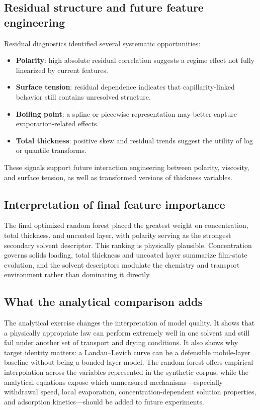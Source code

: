 \documentclass[11pt]{article}
\begin{document}
\subsection{Residual structure and future feature engineering}
Residual diagnostics identified several systematic opportunities:
\begin{itemize}
    \item \textbf{Polarity}: high absolute residual correlation suggests a regime effect not fully linearized by current features.
    \item \textbf{Surface tension}: residual dependence indicates that capillarity-linked behavior still contains unresolved structure.
    \item \textbf{Boiling point}: a spline or piecewise representation may better capture evaporation-related effects.
    \item \textbf{Total thickness}: positive skew and residual trends suggest the utility of log or quantile transforms.
\end{itemize}

These signals support future interaction engineering between polarity, viscosity, and surface tension, as well as transformed versions of thickness variables.

\subsection{Interpretation of final feature importance}
The final optimized random forest placed the greatest weight on concentration, total thickness, and uncoated layer, with polarity serving as the strongest secondary solvent descriptor. This ranking is physically plausible. Concentration governs solids loading, total thickness and uncoated layer summarize film-state evolution, and the solvent descriptors modulate the chemistry and transport environment rather than dominating it directly.

\subsection{What the analytical comparison adds}
The analytical exercise changes the interpretation of model quality. It shows that a physically appropriate law can perform extremely well in one solvent and still fail under another set of transport and drying conditions. It also shows why target identity matters: a Landau--Levich curve can be a defensible mobile-layer baseline without being a bonded-layer model. The random forest offers empirical interpolation across the variables represented in the synthetic corpus, while the analytical equations expose which unmeasured mechanisms---especially withdrawal speed, local evaporation, concentration-dependent solution properties, and adsorption kinetics---should be added to future experiments.
\end{document}
